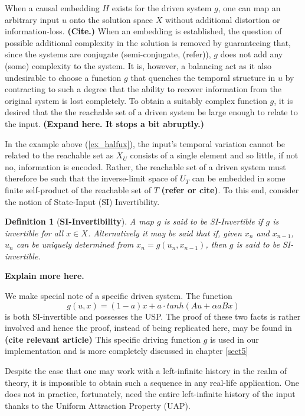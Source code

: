 \documentclass[12 pt]{article}
\newtheorem{Definition}{Definition}[]
\begin{document}
When a causal embedding $H$ exists for the driven system $g$, one can map an arbitrary input ${u}$ onto the solution space $X$ without additional distortion or information-loss.  \textbf{(Cite.)} 
When an embedding is established, the question of possible additional complexity in the solution is removed by guaranteeing that, since the systems are conjugate (semi-conjugate, (refer)), $g$ does not add any (some) complexity to the system.  
It is, however, a balancing act as it also undesirable to choose a function $g$ that quenches the temporal structure in $u$ by contracting to such a degree that the ability to recover information from the original system is lost completely. 
To obtain a suitably complex function $g$, it is desired that the the reachable set of a driven system  be large enough to relate to the input.  \textbf{(Expand here. It stops a bit abruptly.)}
 
In the example above (\ref{ex_halfux}), the input's temporal variation cannot be related to the reachable set as $X_U$ consists of a single element and so little, if not no, information is encoded.  Rather, the reachable set of a driven system must therefore be such that the inverse-limit space of $U_T$ can be embedded in some finite self-product of the reachable set of $T$ \textbf{(refer or cite)}. To this end, consider the notion of State-Input (SI) Invertibility.  

\begin{Definition}
  [\bf SI-Invertibility]\label{Dfn_SIinv}
  A map $g$ is said to be SI-Invertible if $g$ is invertible for all $x\in{X}$. Alternatively it may be said that if, given $x_n$ and $x_{n-1}$, $u_n$ can be uniquely determined from $x_n=g(u_n,x_{n-1})$, then $g$ is said to be SI-invertible.
\end{Definition}
 
\textbf{Explain more here.}

We make special note of a specific driven system. The function 
\begin{equation}  \label{eqn_driving}
g(u,x)=(1-a)x+a{\cdot}tanh(Au+\alpha{a}Bx)
\end{equation} 
is both SI-invertible and possesses the USP. The proof of these two facts is rather involved and  hence the proof, instead of being replicated here, may be found in \textbf{(cite relevant article)}
This specific driving function $g$ is used in our implementation and is more completely discussed in chapter \ref{sect5}

Despite the ease that one may work with a left-infinite history in the realm of theory, it is impossible to obtain such a sequence in any real-life application.  
One does not in practice, fortunately, need the entire left-infinite history of the input thanks to the Uniform Attraction Property (UAP).
\end{document}
